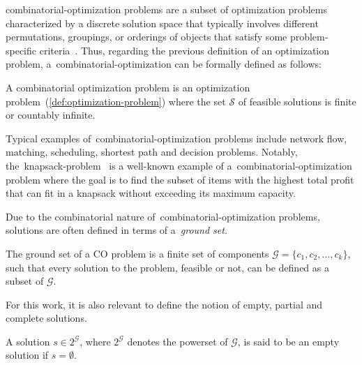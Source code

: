 \acrfull{combinatorial-optimization} problems are a subset of optimization
problems characterized by a discrete solution space that typically involves
different permutations, groupings, or orderings of objects that satisfy some
problem-specific
criteria~\cite{papadimitriou1998combinatorial,vieira2009uma,blummetaheuristics,yu2010combinatorial}.
Thus, regarding the previous definition of an optimization problem,
a~\acrshort{combinatorial-optimization} can be formally defined as follows:

\begin{definition}
  \label{def:combinatorial-optimization-problem}
  A combinatorial optimization problem is an optimization
  problem~(\ref{def:optimization-problem}) where the set $\mathcal{S}$ of
  feasible solutions is finite or countably infinite.
\end{definition}

Typical examples of~\acrshort{combinatorial-optimization} problems include
network flow, matching, scheduling, shortest path and decision problems.
Notably, the~\acrfull{knapsack-problem}~\cite{cacchiani2022knapsack,
  yu2010combinatorial,festa2014brief} is a well-known example of
a~\acrshort{combinatorial-optimization} problem where the goal is to find the
subset of items with the highest total profit that can fit in a knapsack without
exceeding its maximum capacity.

Due to the combinatorial nature of~\acrshort{combinatorial-optimization}
problems, solutions are often defined in terms of a~\emph{ground set}.

\begin{definition}
  The ground set of a CO problem is a finite set of
  components $\mathcal{G} = \{c_1, c_2, \ldots, c_k\}$, such that every solution to the
  problem, feasible or not, can be defined as a subset of $\mathcal{G}$.  \end{definition}

For this work, it is also relevant to define the notion of empty, partial and
complete solutions.

\begin{definition}
  \label{def:empty-solution}
  A solution $s \in 2^\mathcal{G}$, where $2^\mathcal{G}$ denotes the powerset of $\mathcal{G}$,
  is said to be an empty solution if $s = \emptyset$.
\end{definition}

